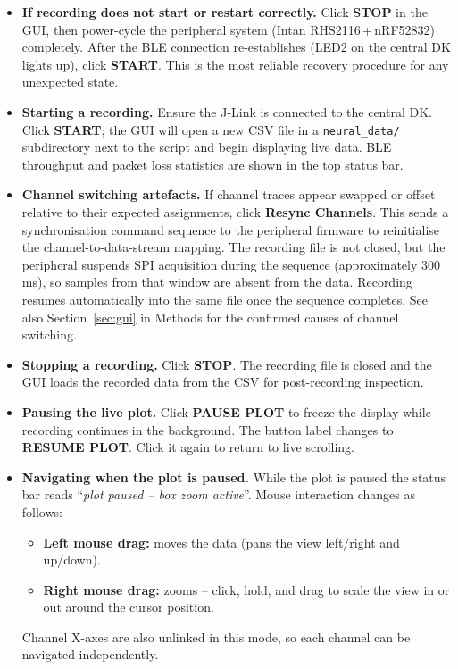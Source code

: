 \begin{itemize}

    \item \textbf{If recording does not start or restart correctly.}
    Click \textbf{STOP} in the GUI, then power-cycle the peripheral
    system (Intan RHS2116\,+\,nRF52832) completely. After the BLE connection
    re-establishes (LED2 on the central DK lights up), click \textbf{START}.
    This is the most reliable recovery procedure for any unexpected state.

    \item \textbf{Starting a recording.}
    Ensure the J-Link is connected to the central DK. Click \textbf{START};
    the GUI will open a new CSV file in a \texttt{neural\_data/} subdirectory
    next to the script and begin displaying live data. BLE throughput and
    packet loss statistics are shown in the top status bar.

    \item \textbf{Channel switching artefacts.}
    If channel traces appear swapped or offset relative to their expected
    assignments, click \textbf{Resync Channels}. This sends a synchronisation
    command sequence to the peripheral firmware to reinitialise the
    channel-to-data-stream mapping. The recording file is not closed, but
    the peripheral suspends SPI acquisition during the sequence
    (approximately 300\,ms), so samples from that window are absent from
    the data. Recording resumes automatically into the same file once the
    sequence completes.
    See also Section~\ref{sec:gui} in Methods for the confirmed causes of
    channel switching.

    \item \textbf{Stopping a recording.}
    Click \textbf{STOP}. The recording file is closed and the GUI loads the
    recorded data from the CSV for post-recording inspection.

    \item \textbf{Pausing the live plot.}
    Click \textbf{PAUSE PLOT} to freeze the display while recording continues
    in the background. The button label changes to \textbf{RESUME PLOT}.
    Click it again to return to live scrolling.

    \item \textbf{Navigating when the plot is paused.}
    While the plot is paused the status bar reads
    ``\textit{plot paused -- box zoom active}''.
    Mouse interaction changes as follows:
    \begin{itemize}
        \item \textbf{Left mouse drag:} moves the data (pans the view
        left/right and up/down).
        \item \textbf{Right mouse drag:} zooms -- click, hold, and drag
        to scale the view in or out around the cursor position.
    \end{itemize}
    Channel X-axes are also unlinked in this mode, so each channel can be
    navigated independently.


\end{itemize}
